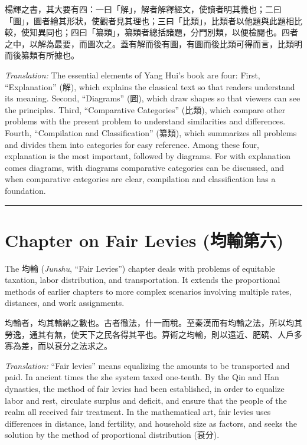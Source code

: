 \documentclass[11pt,a4paper]{article}
\newcommand{\longline}{\noindent\rule{\textwidth}{0.4pt}}
\newcommand{\zh}[1]{{#1}}
\newenvironment{chpassage}{%
  \par\medskip
  \begin{center}
  \begin{minipage}{0.95\textwidth}
  \setlength{\parindent}{2em}
  \linespread{1.3}\selectfont
}{%
  \end{minipage}
  \end{center}
  \medskip
}
\begin{document}
\begin{chpassage}
\zh{楊輝之書，其大要有四：一曰「解」，解者解釋經文，使讀者明其義也；二曰「圖」，圖者繪其形狀，使觀者見其理也；三曰「比類」，比類者以他題與此題相比較，使知異同也；四曰「纂類」，纂類者總括諸題，分門別類，以便檢閱也。四者之中，以解為最要，而圖次之。蓋有解而後有圖，有圖而後比類可得而言，比類明而後纂類有所據也。}

\medskip
\textit{Translation:} The essential elements of Yang Hui's book are four: First,
``Explanation'' (\zh{解}), which explains the classical text so that readers
understand its meaning. Second, ``Diagrams'' (\zh{圖}), which draw shapes so
that viewers can see the principles. Third, ``Comparative Categories''
(\zh{比類}), which compare other problems with the present problem to
understand similarities and differences. Fourth, ``Compilation and
Classification'' (\zh{纂類}), which summarizes all problems and divides them
into categories for easy reference. Among these four, explanation is the most
important, followed by diagrams. For with explanation comes diagrams, with
diagrams comparative categories can be discussed, and when comparative
categories are clear, compilation and classification has a foundation.
\end{chpassage}

\vspace{1cm}
\longline

\newpage

\section{Chapter on Fair Levies (\zh{均輸第六})}
\label{sec:junshu}

The \zh{均輸} (\textit{Junshu}, ``Fair Levies'') chapter deals with problems
of equitable taxation, labor distribution, and transportation. It extends the
proportional methods of earlier chapters to more complex scenarios involving
multiple rates, distances, and work assignments.

\begin{chpassage}
\zh{均輸者，均其輸納之數也。古者徹法，什一而稅。至秦漢而有均輸之法，所以均其勞逸，通其有無，使天下之民各得其平也。算術之均輸，則以遠近、肥磽、人戶多寡為差，而以衰分之法求之。}

\medskip
\textit{Translation:} ``Fair levies'' means equalizing the amounts to be
transported and paid. In ancient times the zhe system taxed one-tenth. By the
Qin and Han dynasties, the method of fair levies had been established, in order
to equalize labor and rest, circulate surplus and deficit, and ensure that the
people of the realm all received fair treatment. In the mathematical art, fair
levies uses differences in distance, land fertility, and household size as
factors, and seeks the solution by the method of proportional distribution
(\zh{衰分}).
\end{chpassage}
\end{document}
